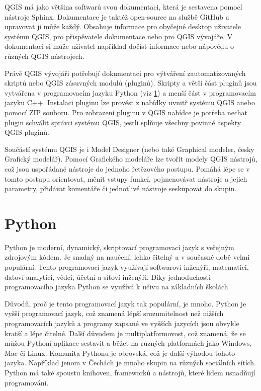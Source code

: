 
QGIS má jako většina softwarů svou dokumentaci, která je sestavena pomocí nástroje Sphinx. 
Dokumentace je taktéž open-source na službě GitHub a upravovat ji může každý. Obsahuje
informace pro obyčejné desktop uživatele systému QGIS, pro přispěvatele dokumentace nebo pro QGIS
vývojáře. V dokumentaci si může uživatel například dočíst informace nebo nápovědu o různých
QGIS nástrojech.

Právě QGIS vývojáři potřebují dokumentaci pro výtváření zautomatizovaných skriptů nebo QGIS zásuvných modulů (pluginů).
Skripty a větší část pluginů jsou vytvářena v programovacím jazyku Python (viz \ref{section-python})
a menší část v programovacím jazyku C++. Instalaci pluginu lze provést z nabídky uvnitř systému QGIS
anebo pomocí ZIP souboru. Pro zobrazení pluginu v QGIS nabídce je potřeba nechat plugin
schválit správci systému QGIS, jestli splňuje všechny povinné aspekty QGIS pluginů.

Součástí systému QGIS je i Model Designer (nebo také Graphical modeler, česky Grafický modelář).
Pomocí Grafického modeláře lze tvořit modely QGIS nástrojů, což jsou uspořádané nástroje do jednoho řetězového postupu.
Pomáhá lépe se v tomto postupu orientovat, měnit vstupy funkcí, pojmenovávat nástroje a jejich parametry,
přidávat komentáře či jednotlivé nástroje seskupovat do skupin. 

\section{Python}
\label{section-python}
Python je moderní, dynamický, skriptovací programovací jazyk s veřejným zdrojovým kódem. 
Je snadný na naučení, lehko čitelný a v současné době velmi populární. Tento programovací jazyk využívají
softwaroví inženýři, matematici, datoví analytici, vědci, účetní a síťoví inženýři.
Díky jednoduchosti programovacího jazyka Python se využívá k učivu na základních školách.

Důvodů, proč je tento programovací jazyk tak populární, je mnoho. Python je vyšší programovací jazyk,
což znamená lépší srozumitelnost než nižších programovacích jazyků a programy zapsané
ve vyšších jazycích jsou obvykle kratší a lépe čitelné.  Další důvodem je multiplatformovost,
což znamená, že se můžou Pythoní aplikace sestavit a běžet na různých platformách jako 
Windows, Mac či Linux. Komunita Pythonu je obrovská, což je další výhodou tohoto jazyka.
Například jenom v Čechách je mnoho skupin na různých sociálních sítích.
Python má také spoustu knihoven, frameworků a nástrojů, které lidem usnadňují programování.

